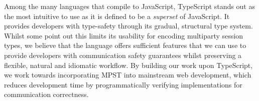 Among the many languages that compile to JavaScript,
TypeScript stands out as the most intuitive to use as it is defined
to be a \textit{superset} of JavaScript. It provides developers
with type-safety through its gradual, structural type system.
Whilst some \cite{MVU2020} point out this limits its usability for
encoding multiparty session types, we believe that the language
offers sufficient features that we can use to provide developers with
communication safety guarantees whilst preserving a flexible, natural
and idiomatic workflow. By building our work upon TypeScript, we
work towards incorporating MPST into mainstream web development,
which reduces development time by programmatically verifying 
implementations for communication correctness.